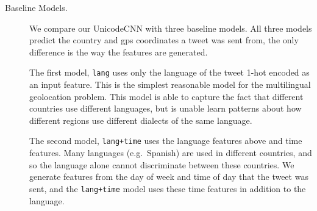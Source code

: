 \documentclass[sigconf,anonymous,review]{acmart}
\newcommand{\str}[1]{\texttt{#1}}
\newcommand{\ignore}[1]{}
\newcommand{\fixme}[1]{\textcolor{red}{\textbf{FIXME:} {#1}}}
\begin{document}
\begin{description}

\ignore{
\begin{figure}

    \vspace{-0.1in}
    \hspace{0.5in}
    \resizebox{0.45\textwidth}{!}{}
    \hspace{-0.5in}
    \vspace{-0.25in}

    \textbf{
    \caption{
        Language distribution of tweets in our dataset.
        Most tweets are not written in English,
        but prior work focuses on this special case.
        (*) Twitter classifies approximately 8\% of tweets in our dataset as having an unknown language.
        This may be because the tweet is written in a language that Twitter does not officially support,
        or because the tweet has too little text.
    \label{fig:lang}
    }
    }
\end{figure}
}

\item[Baseline Models.]

We compare our UnicodeCNN with three baseline models.
All three models predict the country and gps coordinates a tweet was sent from,
the only difference is the way the features are generated.

The first model, \str{lang} uses only the language of the tweet 1-hot encoded as an input feature.
This is the simplest reasonable model for the multilingual geolocation problem.
This model is able to capture the fact that different countries use different languages,
but is unable learn patterns about how different regions use different dialects of the same language. 

The second model, \str{lang+time} uses the language features above and time features.
Many languages (e.g.\ Spanish) are used in different countries,
and so the language alone cannot discriminate between these countries.
We generate features from the day of week and time of day that the tweet was sent,
and the \str{lang+time} model uses these time features in addition to the language.


\end{description}
\end{document}
